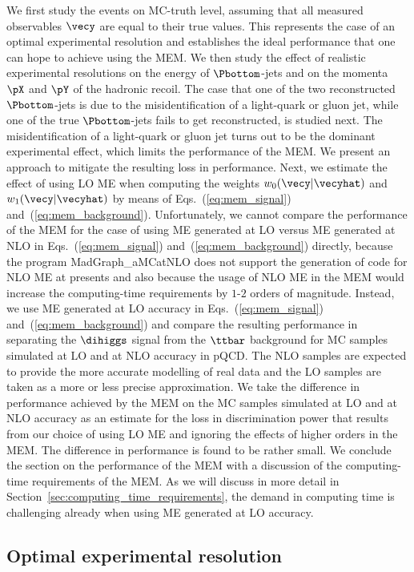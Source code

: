 We first study the events on MC-truth level, assuming that all measured observables $\vecy$ are equal to their true values.
This represents the case of an optimal experimental resolution and establishes the ideal performance that one can hope to achieve using the MEM.
We then study the effect of realistic experimental resolutions on the energy of $\Pbottom$-jets and on the momenta $\pX$ and $\pY$ of the hadronic recoil.
The case that one of the two reconstructed $\Pbottom$-jets is due to the misidentification of a light-quark or gluon jet,
while one of the true $\Pbottom$-jets fails to get reconstructed, is studied next.
The misidentification of a light-quark or gluon jet turns out to be the dominant experimental effect,
which limits the performance of the MEM.
We present an approach to mitigate the resulting loss in performance.
Next, we estimate the effect of using LO ME when computing the weights $w_{0}(\vecy|\vecyhat)$ and $w_{1}(\vecy|\vecyhat)$ 
by means of Eqs.~(\ref{eq:mem_signal}) and~(\ref{eq:mem_background}).
Unfortunately, we cannot compare the performance of the MEM
for the case of using ME generated at LO versus ME generated at NLO in Eqs.~(\ref{eq:mem_signal}) and~(\ref{eq:mem_background}) directly,
because the program MadGraph\_aMCatNLO does not support the generation of code for NLO ME at presents
and also because the usage of NLO ME in the MEM would increase the computing-time requirements by $1$-$2$ orders of magnitude.
Instead, we use ME generated at LO accuracy in Eqs.~(\ref{eq:mem_signal}) and~(\ref{eq:mem_background}) 
and compare the resulting performance in separating the $\dihiggs$ signal from the $\ttbar$ background
for MC samples simulated at LO and at NLO accuracy in pQCD.
The NLO samples are expected to provide the more accurate modelling of real data and the LO samples are taken as a more or less precise approximation.
We take the difference in performance achieved by the MEM on the MC samples simulated at LO and at NLO accuracy
as an estimate for the loss in discrimination power that results from our choice of using LO ME and ignoring the effects of higher orders in the MEM.
The difference in performance is found to be rather small.
We conclude the section on the performance of the MEM with a discussion of the computing-time requirements of the MEM.
As we will discuss in more detail in Section~\ref{sec:computing_time_requirements}, the demand in computing time is challenging already when using ME generated at LO accuracy.


\subsection{Optimal experimental resolution}

